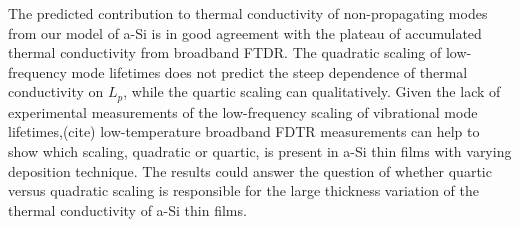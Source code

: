 \documentclass[aps,prb,twocolumn,superscriptaddress,footinbib,amsmath,amssymb,floatfix]{revtex4}
\begin{document}
The predicted contribution to thermal conductivity of 
non-propagating modes from our model of a-Si is in good agreement 
with the plateau of accumulated thermal conductivity from broadband 
FTDR. The quadratic scaling of low-frequency mode lifetimes 
does not predict the steep dependence of thermal conductivity on
$L_p$, while the quartic scaling can qualitatively. Given the 
lack of experimental measurements of the low-frequency scaling of 
vibrational mode lifetimes,(cite) low-temperature broadband FDTR 
measurements can help to show which scaling, quadratic or 
quartic, is present in a-Si thin films with varying deposition 
technique. The results could answer the question of whether 
quartic versus quadratic scaling is responsible for the large 
thickness variation of the thermal conductivity of a-Si thin films. 
\end{document}
